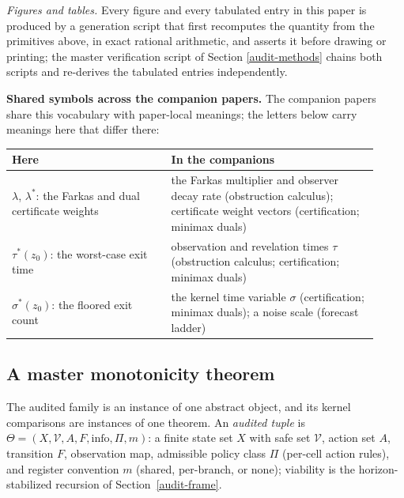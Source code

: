 \documentclass[10pt,twocolumn]{article}
\theoremstyle{plain}
\theoremstyle{definition}
\theoremstyle{remark}
\begin{document}
\emph{Figures and tables.} Every figure and every tabulated entry in
this paper is produced by a generation script that first recomputes the
quantity from the primitives above, in exact rational arithmetic, and
asserts it before drawing or printing; the master verification script of
Section \ref{audit-methods} chains both scripts and re-derives the tabulated
entries independently.

\medskip
\noindent\textbf{Shared symbols across the companion papers.} The
companion papers share this vocabulary with paper-local meanings; the
letters below carry meanings here that differ there:
\begin{center}\small
\begin{tabular}{@{}p{0.40\linewidth}p{0.52\linewidth}@{}}
\toprule
\textbf{Here} & \textbf{In the companions} \\
\midrule
\(\lambda\), \(\lambda^{*}\): the Farkas and dual certificate weights &
the Farkas multiplier and observer decay rate (obstruction calculus);
certificate weight vectors (certification; minimax duals) \\
\(\tau^{*}(z_0)\): the worst-case exit time &
observation and revelation times \(\tau\) (obstruction calculus;
certification; minimax duals) \\
\(\sigma^{*}(z_0)\): the floored exit count &
the kernel time variable \(\sigma\) (certification; minimax duals);
a noise scale (forecast ladder) \\
\bottomrule
\end{tabular}
\end{center}

\subsection{A master monotonicity theorem}\label{audit-mtheorem}

The audited family is an instance of one abstract object, and its
kernel comparisons are instances of one theorem. An \emph{audited
tuple} is
\(\Theta = (X, \mathcal{V}, A, F, \mathrm{info}, \Pi, m)\): a finite
state set \(X\) with safe set \(\mathcal{V}\), action set \(A\),
transition \(F\), observation map, admissible policy class \(\Pi\)
(per-cell action rules), and register convention \(m\) (shared, per-branch,
or none); viability is the horizon-stabilized recursion of
Section~\ref{audit-frame}.
\end{document}
